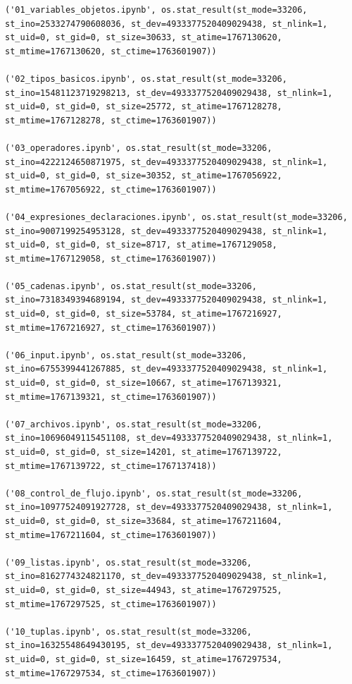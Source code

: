 \documentclass[
  spanish,
  letterpaper,
]{scrbook}
\theoremstyle{definition}
\theoremstyle{remark}
\begin{document}
\begin{verbatim}
('01_variables_objetos.ipynb', os.stat_result(st_mode=33206, st_ino=2533274790608036, st_dev=4933377520409029438, st_nlink=1, st_uid=0, st_gid=0, st_size=30633, st_atime=1767130620, st_mtime=1767130620, st_ctime=1763601907))

('02_tipos_basicos.ipynb', os.stat_result(st_mode=33206, st_ino=15481123719298213, st_dev=4933377520409029438, st_nlink=1, st_uid=0, st_gid=0, st_size=25772, st_atime=1767128278, st_mtime=1767128278, st_ctime=1763601907))

('03_operadores.ipynb', os.stat_result(st_mode=33206, st_ino=4222124650871975, st_dev=4933377520409029438, st_nlink=1, st_uid=0, st_gid=0, st_size=30352, st_atime=1767056922, st_mtime=1767056922, st_ctime=1763601907))

('04_expresiones_declaraciones.ipynb', os.stat_result(st_mode=33206, st_ino=9007199254953128, st_dev=4933377520409029438, st_nlink=1, st_uid=0, st_gid=0, st_size=8717, st_atime=1767129058, st_mtime=1767129058, st_ctime=1763601907))

('05_cadenas.ipynb', os.stat_result(st_mode=33206, st_ino=7318349394689194, st_dev=4933377520409029438, st_nlink=1, st_uid=0, st_gid=0, st_size=53784, st_atime=1767216927, st_mtime=1767216927, st_ctime=1763601907))

('06_input.ipynb', os.stat_result(st_mode=33206, st_ino=6755399441267885, st_dev=4933377520409029438, st_nlink=1, st_uid=0, st_gid=0, st_size=10667, st_atime=1767139321, st_mtime=1767139321, st_ctime=1763601907))

('07_archivos.ipynb', os.stat_result(st_mode=33206, st_ino=10696049115451108, st_dev=4933377520409029438, st_nlink=1, st_uid=0, st_gid=0, st_size=14201, st_atime=1767139722, st_mtime=1767139722, st_ctime=1767137418))

('08_control_de_flujo.ipynb', os.stat_result(st_mode=33206, st_ino=10977524091927728, st_dev=4933377520409029438, st_nlink=1, st_uid=0, st_gid=0, st_size=33684, st_atime=1767211604, st_mtime=1767211604, st_ctime=1763601907))

('09_listas.ipynb', os.stat_result(st_mode=33206, st_ino=8162774324821170, st_dev=4933377520409029438, st_nlink=1, st_uid=0, st_gid=0, st_size=44943, st_atime=1767297525, st_mtime=1767297525, st_ctime=1763601907))

('10_tuplas.ipynb', os.stat_result(st_mode=33206, st_ino=16325548649430195, st_dev=4933377520409029438, st_nlink=1, st_uid=0, st_gid=0, st_size=16459, st_atime=1767297534, st_mtime=1767297534, st_ctime=1763601907))


\end{verbatim}
\end{document}
